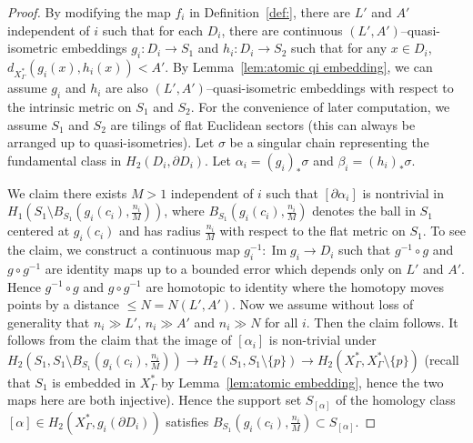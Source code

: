 \documentclass[11pt]{amsart}
\theoremstyle{definition}
\newcommand{\Xa}{X^{\ast}}
\newcommand{\im}{\operatorname{Im}}
\begin{document}
\begin{proof}
By modifying the map $f_i$ in Definition~\ref{def:}, there are $L'$ and $A'$ independent of $i$ such that for each $D_i$, there are continuous $(L',A')$--quasi-isometric embeddings $g_i\colon D_i\to S_1$ and $h_i\colon D_i\to S_2$ such that for any $x\in D_i$, $d_{\Xa_\Gamma}(g_i(x),h_i(x))<A'$. By Lemma~\ref{lem:atomic qi embedding}, we can assume $g_i$ and $h_i$ are also $(L',A')$--quasi-isometric embeddings with respect to the intrinsic metric on $S_1$ and $S_2$. For the convenience of later computation, we assume $S_1$ and $S_2$ are tilings of flat Euclidean sectors (this can always be arranged up to quasi-isometries). Let $\sigma$ be a singular chain representing the fundamental class in $H_2(D_i,\partial D_i)$. Let $\alpha_i=(g_i)_{\ast}\sigma$ and $\beta_i=(h_i)_{\ast}\sigma$. 

We claim there exists $M>1$ independent of $i$ such that $[\partial \alpha_i]$ is nontrivial in $H_1(S_1\setminus B_{S_1}(g_i(c_i),\frac{n_i}{M}))$, where $B_{S_1}(g_i(c_i),\frac{n_i}{M})$ denotes the ball in $S_1$ centered at $g_i(c_i)$ and has radius $\frac{n_i}{M}$ with respect to the flat metric on $S_1$. To see the claim, we construct a continuous map $g^{-1}_i\colon \im g_i\to D_i$ such that $g^{-1}\circ g$ and $g\circ g^{-1}$ are identity maps up to a bounded error which depends only on $L'$ and $A'$. Hence $g^{-1}\circ g$ and $g\circ g^{-1}$ are homotopic to identity where the homotopy moves points by a distance $\le N=N(L',A')$. Now we assume without loss of generality that $n_i\gg L'$, $n_i\gg A'$ and $n_i\gg N$ for all $i$. Then the claim follows. It follows from the claim that the image of $[\alpha_i]$ is non-trivial under $H_2(S_1,S_1\setminus B_{S_1}(g_i(c_i),\frac{n_i}{M}))\to H_2(S_1,S_1\setminus\{p\})\to H_2(\Xa_\Gamma,\Xa_\Gamma\setminus\{p\})$ (recall that $S_1$ is embedded in $\Xa_\Gamma$ by Lemma~\ref{lem:atomic embedding}, hence the two maps here are both injective). Hence the support set $S_{[\alpha]}$ of the homology class $[\alpha]\in H_2(\Xa_\Gamma,g_i(\partial D_i))$ satisfies $B_{S_1}(g_i(c_i),\frac{n_i}{M})\subset S_{[\alpha]}$. 


\end{proof}
\end{document}
